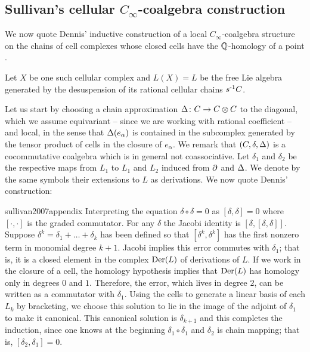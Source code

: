 \subsection{Sullivan's cellular $C_\infty$-coalgebra construction} \label{ss:dennis construction}

We now quote Dennis' inductive construction of a local $C_\infty$-coalgebra structure on the chains of cell complexes whose closed cells have the $\mathbb{Q}$-homology of a point \cite{sullivan2007appendix}.

Let $X$ be one such cellular complex and $L(X) = L$ be the free Lie algebra generated by the desuspension of its rational cellular chains $s^{\mbox{\scriptsize -1}}C$.

Let us start by choosing a chain approximation $\operatorname{\Delta} \colon C \to C \otimes C$ to the diagonal, which we assume equivariant -- since we are working with rational coefficient -- and local, in the sense that $\operatorname{\Delta}(e_\alpha)$ is contained in the subcomplex generated by the tensor product of cells in the closure of $e_\alpha$.
We remark that $(C, \delta, \operatorname{\Delta})$ is a cocommutative coalgebra which is in general not coassociative.
Let $\delta_1$ and $\delta_2$ be the respective maps from $L_1$ to $L_1$ and $L_2$ induced from $\operatorname{\partial}$ and $\operatorname{\Delta}$.
We denote by the same symbols their extensions to $L$ as derivations.
We now quote Dennis' construction:

\begin{displaycquote}[p.251]{sullivan2007appendix}
	Interpreting the equation $\delta \circ \delta = 0$ as $[\delta, \delta] = 0$ where $[\cdot, \cdot]$ is the graded commutator.
	For any $\delta$ the Jacobi identity is $[\delta, [\delta, \delta]]$.
	Suppose $\delta^k = \delta_1 + \dots + \delta_k$ has been defined so that $[\delta^k, \delta^k]$ has the first nonzero term in monomial degree $k + 1$.
	Jacobi implies this error commutes with $\delta_1$; that is, it is a closed element in the complex $\mathrm{Der}(L)$ of derivations of $L$.
	If we work in the closure of a cell, the homology hypothesis implies that $\mathrm{Der}(L)$ has homology only in degrees $0$ and $1$.
	Therefore, the error, which lives in degree $2$, can be written as a commutator with $\delta_1$.
	Using the cells to generate a linear basis of each $L_k$ by bracketing, we choose this solution to lie in the image of the adjoint of $\delta_1$ to make it canonical.
	This canonical solution is $\delta_{k+1}$ and this completes the induction, since one knows at the beginning $\delta_1 \circ \delta_1$
	and $\delta_2$ is chain mapping; that is, $[\delta_2, \delta_1] = 0$.
\end{displaycquote}

